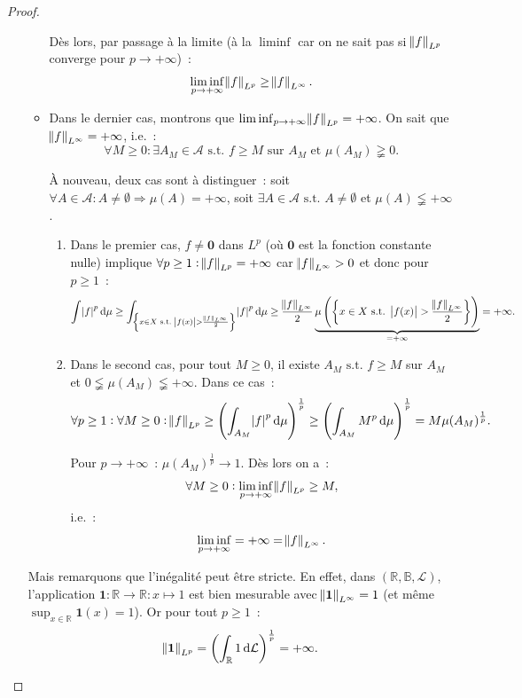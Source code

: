 \documentclass{article}
\newcommand{\pinfty}{{+\infty}}
\newcommand{\st}{\text{ s.t. }}
\newcommand{\R}{{\mathbb R}}
\newcommand{\B}{{\mathbb B}}
\begin{document}
\begin{proof}
\begin{enumerate}
\begin{itemize}
		Dès lors, par passage à la limite (à la $\liminf$ car on ne sait pas si $\norm f_{L^p}$ converge pour $p \to \pinfty$)~:
		\[\liminf_{p \to \pinfty} \norm f_{L^p} \geq \norm f_{L^\infty}.\]

		\item Dans le dernier cas, montrons que $\liminf_{p \to \pinfty}\norm f_{L^p} = \pinfty$. On sait que $\norm f_{L^\infty} = \pinfty$, i.e.~:
		\[\forall M \geq 0 : \exists A_M \in \mathcal A \st f \geq M \text{ sur } A_M \text{ et } \mu(A_M) \gneqq 0.\]

		À nouveau, deux cas sont à distinguer~: soit $\forall A \in \mathcal A : A \neq \emptyset \Rightarrow \mu(A) = \pinfty$, soit $\exists A \in \mathcal A \st A \neq \emptyset$
		et $\mu(A) \lneqq \pinfty$.
		\begin{enumerate}
			\item Dans le premier cas, $f \neq \mathbf 0$ dans $L^p$ (où $\mathbf 0$ est la fonction constante nulle) implique $\forall p \geq 1 : \norm f_{L^p} = \pinfty$ car
			$\norm f_{L^\infty} > 0$ et donc pour $p \geq 1$~:
			\[\int \abs f^p\dif\mu \geq \int_{\left\{x \in X \st \abs {f(x)} > \frac {\norm f_{L^\infty}}2\right\}}\abs f^p\dif\mu
			\geq \frac {\norm f_{L^\infty}}2\underbrace {\mu\left(\left\{x \in X \st \abs {f(x)} > \frac {\norm f_{L^\infty}}2\right\}\right)}_{= \pinfty} = \pinfty.\]

			\item Dans le second cas, pour tout $M \geq 0$, il existe $A_M \st f \geq M$ sur $A_M$ et $0 \lneqq \mu(A_M) \lneqq \pinfty$. Dans ce cas~:
			\[\forall p \geq 1 : \forall M \geq 0 : \norm f_{L^p} \geq \left(\int_{A_M}\abs f^p\dif\mu\right)^{\frac 1p} \geq \left(\int_{A_M}M^p\dif\mu\right)^{\frac 1p}
			= M\mu(A_M)^{\frac 1p}.\]

			Pour $p \to \pinfty$~: $\mu(A_M)^{\frac 1p} \to 1$. Dès lors on a~:
			\[\forall M \geq 0 : \liminf_{p \to \pinfty} \norm f_{L^p} \geq M,\]
			i.e.~:
			\[\liminf_{p \to \pinfty} = \pinfty = \norm f_{L^\infty}.\]
		\end{enumerate}
	\end{itemize}

	Mais remarquons que l'inégalité peut être stricte. En effet, dans $(\R, \B, \mathcal L)$, l'application $\mathbf 1 : \R \to \R : x \mapsto 1$ est bien mesurable
	avec $\norm {\mathbf 1}_{L^\infty} = 1$ (et même $\sup_{x \in \R}\mathbf 1(x) = 1$). Or pour tout $p \geq 1$~:
	\[\norm {\mathbf 1}_{L^p} = \left(\int_\R 1\dif\mathcal L\right)^{\frac 1p} = \pinfty.\]


\end{enumerate}
\end{proof}
\end{document}
